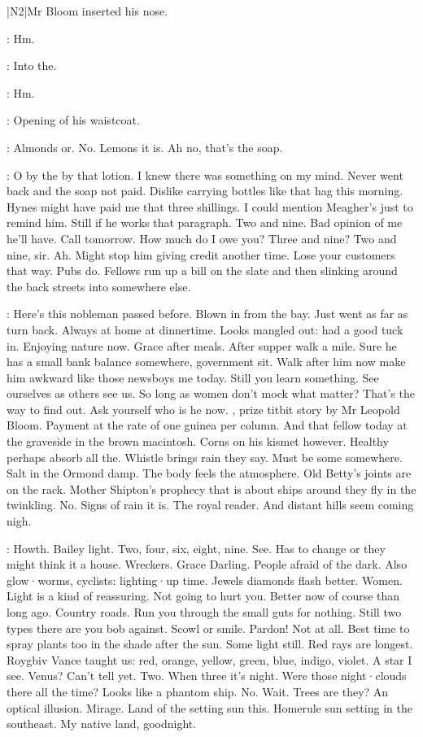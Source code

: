 |N2|Mr Bloom inserted his nose.

\Bloom:
Hm.

:
Into the.

\Bloom:
Hm.

:
Opening of his waistcoat.

\Bloom:
Almonds or.
No.
Lemons it is.
Ah no,
that's the soap.

\Bloom:
O by the by that lotion.
I knew there was something on my mind.
Never went back and the soap not paid.
Dislike carrying bottles like that
hag this morning.
Hynes might have paid me that three shillings.
I could
mention Meagher's just to remind him.
Still if he works that paragraph.
Two and nine.
Bad opinion of me he'll have.
Call tomorrow.
How much do
I owe you?
Three and nine?
Two and nine,
sir.
Ah.
Might stop him giving
credit another time.
Lose your customers that way.
Pubs do.
Fellows run up
a bill on the slate and then slinking around the back streets into
somewhere else.

\Bloom:
Here's this nobleman passed before.
Blown in from the bay.
Just went
as far as turn back.
Always at home at dinnertime.
Looks mangled out:
had
a good tuck in.
Enjoying nature now.
Grace after meals.
After supper walk
a mile.
Sure he has a small bank balance somewhere,
government sit.
Walk
after him now make him awkward like those newsboys me today.
Still you
learn something.
See ourselves as others see us.
So long as women don't
mock what matter?
That's the way to find out.
Ask yourself who is he now.
,
prize titbit story by Mr Leopold Bloom.
Payment at the rate of one guinea per column.
And that fellow today at the
graveside in the brown macintosh.
Corns on his kismet however.
Healthy
perhaps absorb all the.
Whistle brings rain they say.
Must be some
somewhere.
Salt in the Ormond damp.
The body feels the atmosphere.
Old
Betty's joints are on the rack.
Mother Shipton's prophecy that is about
ships around they fly in the twinkling.
No.
Signs of rain it is.
The royal
reader.
And distant hills seem coming nigh.

\Bloom:
Howth.
Bailey light.
Two,
four,
six,
eight,
nine.
See.
Has to change or
they might think it a house.
Wreckers.
Grace Darling.
People afraid of the
dark.
Also glow·worms,
cyclists:
lighting·up time.
Jewels diamonds flash
better.
Women.
Light is a kind of reassuring.
Not going to hurt you.
Better now of course than long ago.
Country roads.
Run you through the
small guts for nothing.
Still two types there are you bob against.
Scowl or smile.
Pardon!
Not at all.
Best time to spray plants too in the
shade after the sun.
Some light still.
Red rays are longest.
Roygbiv
Vance taught us:
red,
orange,
yellow,
green,
blue,
indigo,
violet.
A star I see.
Venus?
Can't tell yet.
Two.
When three it's night.
Were
those night·clouds there all the time?
Looks like a phantom ship.
No.
Wait.
Trees are they?
An optical illusion.
Mirage.
Land of the setting
sun this.
Homerule sun setting in the southeast.
My native land,
goodnight.

